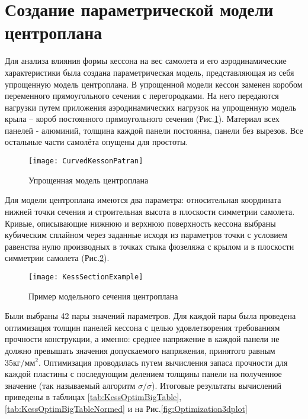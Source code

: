 \section{Создание параметрической модели центроплана}

Для анализа влияния формы кессона на вес самолета и его аэродинамические характеристики была создана параметрическая модель, представляющая из себя упрощенную модель центроплана. В упрощенной модели кессон заменен коробом переменного прямоугольного сечения с перегородками. На него передаются нагрузки путем приложения аэродинамических нагрузок на упрощенную модель крыла -- короб постоянного прямоугольного сечения (Рис.\ref{fig:CurvedKessonPatran}). Материал всех панелей - алюминий, толщина каждой панели постоянна, панели без вырезов. Все остальные части самолёта опущены для простоты.  

\begin{figure}[ht]
\centering
\texttt{[image: CurvedKessonPatran]}
\caption{Упрощенная модель центроплана}
\label{fig:CurvedKessonPatran}
\end{figure}

Для модели центроплана имеются два параметра: относительная координата нижней точки сечения и строительная высота в плоскости симметрии самолета. Кривые, описывающие нижнюю и верхнюю поверхность кессона выбраны кубическим сплайном через заданные исходя из параметров точки с условием равенства нулю производных в точках стыка фюзеляжа с крылом и в плоскости симметрии самолета (Рис.\ref{fig:KessSectionExample}).

\begin{figure}[ht]
\centering
\texttt{[image: KessSectionExample]}
\caption{Пример модельного сечения центроплана}
\label{fig:KessSectionExample}
\end{figure}

Были выбраны 42 пары значений параметров. Для каждой пары была проведена оптимизация толщин панелей кессона с целью удовлетворения требованиям прочности конструкции, а именно: среднее напряжение в каждой панели не должно превышать значения допускаемого напряжения, принятого равным $35\text{кг}/\text{мм}^2$. Оптимизация проводилась путем вычисления запаса прочности для каждой пластины с последующим делением толщины панели на полученное значение (так называемый алгоритм $\sigma/\sigma$). Итоговые результаты вычислений приведены в таблицах \ref{tab:KessOptimBigTable}, \ref{tab:KessOptimBigTableNormed} и на Рис.\ref{fig:Optimization3dplot}

